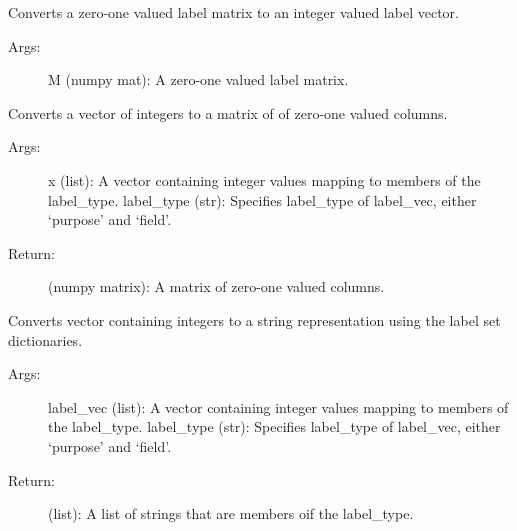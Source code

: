 \documentclass[letterpaper,10pt,english]{sphinxmanual}
\begin{document}

\begin{fulllineitems}
\label{\detokenize{KUHERD:KUHERD.LabelTransformations.mat2vec}}
Converts a zero-one valued label matrix to an integer valued label vector.
\begin{description}
\item[{Args:}] \leavevmode
M (numpy mat): A zero-one valued label matrix.

\end{description}

\end{fulllineitems}


\begin{fulllineitems}
\label{\detokenize{KUHERD:KUHERD.LabelTransformations.vec2mat}}
Converts a vector of integers to a matrix of of zero-one valued columns.
\begin{description}
\item[{Args:}] \leavevmode
x (list): A vector containing integer values mapping to members of the label\_type.
label\_type (str): Specifies label\_type of label\_vec, either `purpose' and `field'.

\item[{Return:}] \leavevmode
(numpy matrix): A matrix of zero-one valued columns.

\end{description}

\end{fulllineitems}


\begin{fulllineitems}
\label{\detokenize{KUHERD:KUHERD.LabelTransformations.vec2string}}
Converts vector containing integers to a string representation using the label set dictionaries.
\begin{description}
\item[{Args:}] \leavevmode
label\_vec (list): A vector containing integer values mapping to members of the label\_type.
label\_type (str): Specifies label\_type of label\_vec, either `purpose' and `field'.

\item[{Return:}] \leavevmode
(list): A list of strings that are members oif the label\_type.

\end{description}

\end{fulllineitems}
\end{document}
